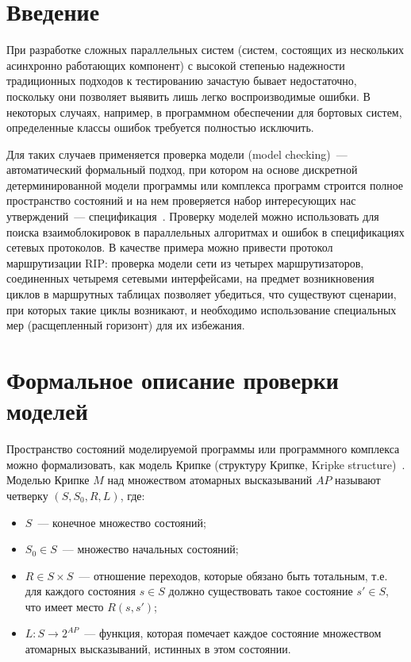 \documentclass[12pt,a4paper,fleqn]{article}
\begin{document}
\section{Введение}
\label{sec:intro}

При разработке сложных параллельных систем (систем, состоящих из нескольких асинхронно работающих компонент) с высокой
степенью надежности традиционных подходов к тестированию зачастую бывает недостаточно, поскольку они позволяет выявить
лишь легко воспроизводимые ошибки. В некоторых случаях, например, в программном обеспечении для бортовых систем,
определенные классы ошибок требуется полностью исключить.

Для таких случаев применяется проверка модели (model checking)~--- автоматический формальный подход, при котором на основе
дискретной детерминированной модели программы или комплекса программ строится полное пространство состояний и на нем
проверяется набор интересующих нас утверждений~--- спецификация~\cite{Clarke}. Проверку моделей можно использовать для
поиска взаимоблокировок в параллельных алгоритмах и ошибок в спецификациях сетевых протоколов. В качестве примера можно
привести протокол маршрутизации RIP: проверка модели сети из четырех маршрутизаторов, соединенных четыремя сетевыми
интерфейсами, на предмет возникновения циклов в маршрутных таблицах позволяет убедиться, что существуют сценарии, при
которых такие циклы возникают, и необходимо использование специальных мер (расщепленный горизонт) для их
избежания.~\cite{RipOnSpin}

\section{Формальное описание проверки моделей}
\label{sec:modelchecking}

Пространство состояний моделируемой программы или программного комплекса можно формализовать, как модель Крипке
(структуру Крипке, Kripke structure)~\cite{Clarke}. Моделью Крипке $M$ над множеством атомарных высказываний $AP$
называют четверку $(S, S_0, R, L)$, где:

\begin{itemize}
\item $S$~--- конечное множество состояний;
\item $S_0 \in S$~--- множество начальных состояний;
\item $R \in S \times S$~--- отношение переходов, которые обязано быть тотальным, т.е. для каждого состояния $s \in S$
  должно существовать такое состояние $s' \in S$, что имеет место $R(s, s')$;
\item $L\colon S \rightarrow 2^{AP}$~--- функция, которая помечает каждое состояние множеством  атомарных высказываний, истинных в этом состоянии.
\end{itemize}
\end{document}

